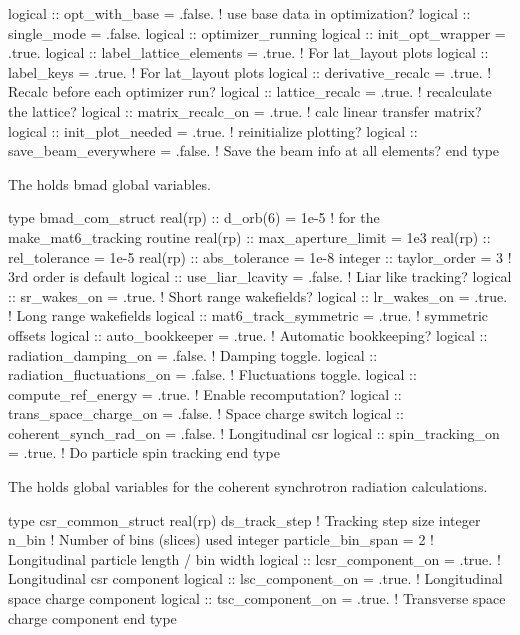 {\begin{example}
  logical :: opt_with_base = .false.     ! use base data in optimization?
  logical :: single_mode = .false.
  logical :: optimizer_running 
  logical :: init_opt_wrapper = .true.
  logical :: label_lattice_elements = .true. ! For lat_layout plots
  logical :: label_keys = .true.             ! For lat_layout plots
  logical :: derivative_recalc = .true.      ! Recalc before each optimizer run?
  logical :: lattice_recalc = .true.         ! recalculate the lattice?
  logical :: matrix_recalc_on = .true.       ! calc linear transfer matrix?  
  logical :: init_plot_needed = .true.       ! reinitialize plotting?
  logical :: save_beam_everywhere = .false.  ! Save the beam info at all elements?
end type
\end{example}

The  holds bmad global variables. 
\begin{example}
  type bmad_com_struct
    real(rp) :: d_orb(6) = 1e-5  ! for the make_mat6_tracking routine
    real(rp) :: max_aperture_limit = 1e3    
    real(rp) :: rel_tolerance = 1e-5
    real(rp) :: abs_tolerance = 1e-8
    integer :: taylor_order = 3              ! 3rd order is default
    logical :: use_liar_lcavity = .false.    ! Liar like tracking?
    logical :: sr_wakes_on = .true.          ! Short range wakefields?
    logical :: lr_wakes_on = .true.          ! Long range wakefields
    logical :: mat6_track_symmetric = .true. ! symmetric offsets
    logical :: auto_bookkeeper = .true.      ! Automatic bookkeeping?
    logical :: radiation_damping_on = .false.       ! Damping toggle.
    logical :: radiation_fluctuations_on = .false.  ! Fluctuations toggle.
    logical :: compute_ref_energy = .true.          ! Enable recomputation?
    logical :: trans_space_charge_on = .false.      ! Space charge switch
    logical :: coherent_synch_rad_on = .false.      ! Longitudinal csr 
    logical :: spin_tracking_on = .true.            ! Do particle spin tracking
  end type
\end{example}

The  holds global variables for the coherent
synchrotron radiation calculations.
\begin{example}
  type csr_common_struct
    real(rp) ds_track_step                   ! Tracking step size
    integer n_bin                            ! Number of bins (slices) used
    integer particle_bin_span = 2            ! Longitudinal particle length / bin width
    logical :: lcsr_component_on = .true.    ! Longitudinal csr component
    logical :: lsc_component_on = .true.     ! Longitudinal space charge component
    logical :: tsc_component_on = .true.     ! Transverse space charge component
  end type
\end{example}


}
